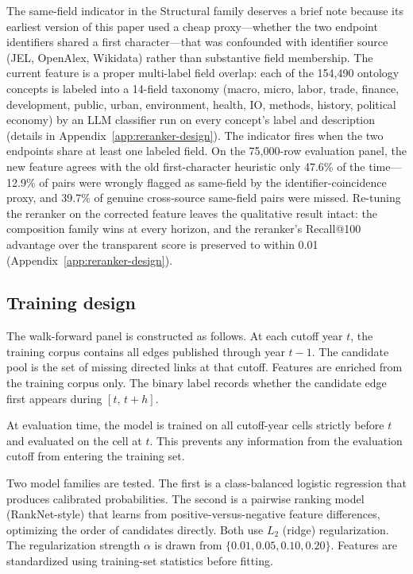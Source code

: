 \documentclass[11pt]{article}
\begin{document}
The same-field indicator in the Structural family deserves a brief note because its earliest version of this paper used a cheap proxy---whether the two endpoint identifiers shared a first character---that was confounded with identifier source (JEL, OpenAlex, Wikidata) rather than substantive field membership. The current feature is a proper multi-label field overlap: each of the 154{,}490 ontology concepts is labeled into a 14-field taxonomy (macro, micro, labor, trade, finance, development, public, urban, environment, health, IO, methods, history, political economy) by an LLM classifier run on every concept's label and description (details in Appendix~\ref{app:reranker-design}). The indicator fires when the two endpoints share at least one labeled field. On the 75{,}000-row evaluation panel, the new feature agrees with the old first-character heuristic only 47.6\% of the time---12.9\% of pairs were wrongly flagged as same-field by the identifier-coincidence proxy, and 39.7\% of genuine cross-source same-field pairs were missed. Re-tuning the reranker on the corrected feature leaves the qualitative result intact: the composition family wins at every horizon, and the reranker's Recall@100 advantage over the transparent score is preserved to within 0.01 (Appendix~\ref{app:reranker-design}).

\subsection{Training design}

The walk-forward panel is constructed as follows. At each cutoff year \(t\), the training corpus contains all edges published through year \(t-1\). The candidate pool is the set of missing directed links at that cutoff. Features are enriched from the training corpus only. The binary label records whether the candidate edge first appears during \([t,\,t+h]\).

At evaluation time, the model is trained on all cutoff-year cells strictly before \(t\) and evaluated on the cell at \(t\). This prevents any information from the evaluation cutoff from entering the training set.

Two model families are tested. The first is a class-balanced logistic regression that produces calibrated probabilities. The second is a pairwise ranking model (RankNet-style) that learns from positive-versus-negative feature differences, optimizing the order of candidates directly. Both use \(L_2\) (ridge) regularization. The regularization strength \(\alpha\) is drawn from \(\{0.01, 0.05, 0.10, 0.20\}\). Features are standardized using training-set statistics before fitting.
\end{document}
